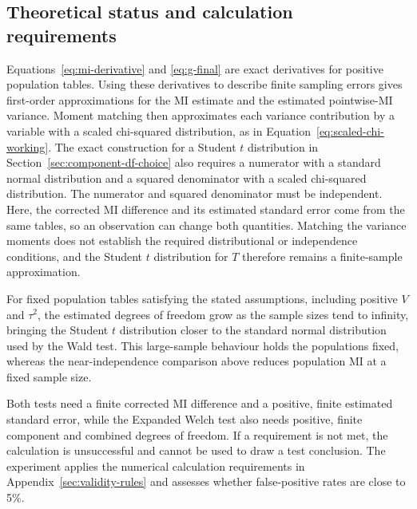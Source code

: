 \begin{samepage}
\subsection{Theoretical status and calculation requirements}

Equations~\eqref{eq:mi-derivative} and \eqref{eq:g-final} are exact
derivatives for positive population tables. Using these derivatives to
describe finite sampling errors gives first-order approximations for the
MI estimate and the estimated pointwise-MI variance. Moment matching then
approximates each variance contribution by a variable with a scaled
chi-squared distribution, as in Equation~\eqref{eq:scaled-chi-working}.
The exact construction for a Student \(t\) distribution in
Section~\ref{sec:component-df-choice} also requires a numerator with a
standard normal distribution and a squared denominator with a scaled
chi-squared distribution. The numerator and squared denominator must be
independent. Here, the corrected MI
difference and its estimated standard error come from the same tables, so
an observation can change both quantities. Matching the variance moments
does not establish the required
distributional or independence conditions, and the Student \(t\) distribution
for \(T\) therefore remains a finite-sample approximation.

For fixed population tables satisfying the stated assumptions, including
positive \(V\) and \(\tau^2\), the estimated degrees of freedom grow as
the sample sizes tend to infinity, bringing the Student \(t\) distribution
closer to the standard normal distribution used by the Wald test. This large-sample behaviour holds the
populations fixed, whereas the near-independence comparison above reduces
population MI at a fixed sample size.
\par\nopagebreak[4]

Both tests need a finite corrected MI difference and a positive, finite
estimated standard error, while the Expanded Welch test also needs positive, finite component
and combined degrees of freedom. If a requirement is not met, the calculation
is unsuccessful and cannot be used to draw a test conclusion.
The experiment applies the numerical calculation requirements in
Appendix~\ref{sec:validity-rules} and assesses whether false-positive rates
are close to 5\%.
\par
\end{samepage}
